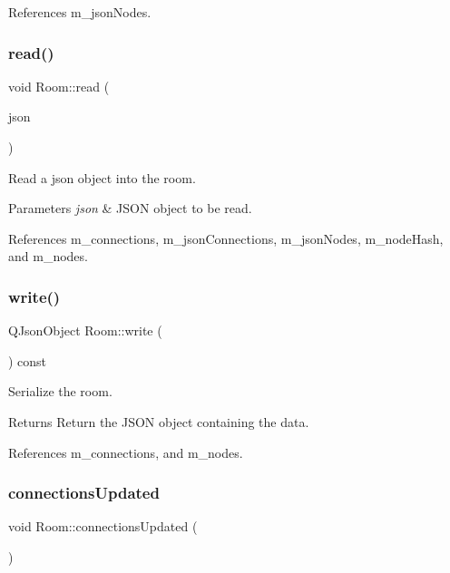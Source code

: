 References m\+\_\+json\+Nodes.

\mbox{\label{classRoom_acb99b086249086eef4878fc315aadb91}} 
\subsubsection{\texorpdfstring{read()}{read()}}
{\footnotesize\ttfamily void Room\+::read (\begin{DoxyParamCaption}\item[{const Q\+Json\+Object \&}]{json }\end{DoxyParamCaption})}



Read a json object into the room. 


\begin{DoxyParams}{Parameters}
{\em json} & J\+S\+ON object to be read. \\
\hline
\end{DoxyParams}


References m\+\_\+connections, m\+\_\+json\+Connections, m\+\_\+json\+Nodes, m\+\_\+node\+Hash, and m\+\_\+nodes.

\mbox{\label{classRoom_a7e9c3212f3282b514b75a92d68727940}} 
\subsubsection{\texorpdfstring{write()}{write()}}
{\footnotesize\ttfamily Q\+Json\+Object Room\+::write (\begin{DoxyParamCaption}{ }\end{DoxyParamCaption}) const}



Serialize the room. 

\begin{DoxyReturn}{Returns}
Return the J\+S\+ON object containing the data. 
\end{DoxyReturn}


References m\+\_\+connections, and m\+\_\+nodes.

\mbox{\label{classRoom_a4fad3e109783442157bb775ef417a57b}} 
\subsubsection{\texorpdfstring{connections\+Updated}{connectionsUpdated}}
{\footnotesize\ttfamily void Room\+::connections\+Updated (\begin{DoxyParamCaption}{ }\end{DoxyParamCaption})\hspace{0.3cm}{\ttfamily [signal]}}

